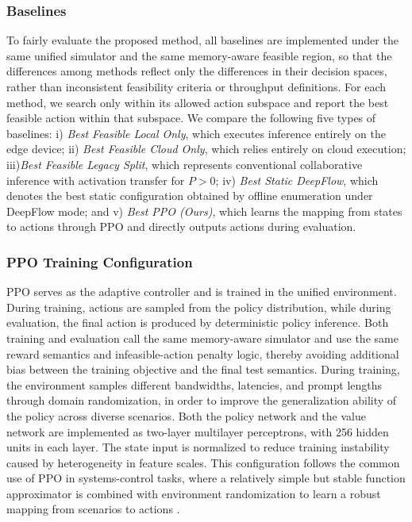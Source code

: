 \documentclass[a4paper,fleqn]{cas-dc}
\begin{document}
\subsubsection{Baselines}

To fairly evaluate the proposed method, all baselines are implemented under the same unified simulator and the same memory-aware feasible region, so that the differences among methods reflect only the differences in their decision spaces, rather than inconsistent feasibility criteria or throughput definitions. For each method, we search only within its allowed action subspace and report the best feasible action within that subspace. We compare the following five types of baselines: i) \emph{Best Feasible Local Only}, which executes inference entirely on the edge device; ii) \emph{Best Feasible Cloud Only}, which relies entirely on cloud execution; iii)\emph{Best Feasible Legacy Split}, which represents conventional collaborative inference with activation transfer for $P>0$; iv) \emph{Best Static DeepFlow}, which denotes the best static configuration obtained by offline enumeration under DeepFlow mode; and v) \emph{Best PPO (Ours)}, which learns the mapping from states to actions through PPO and directly outputs actions during evaluation.

\subsubsection{PPO Training Configuration}

PPO serves as the adaptive controller and is trained in the unified environment. During training, actions are sampled from the policy distribution, while during evaluation, the final action is produced by deterministic policy inference. Both training and evaluation call the same memory-aware simulator and use the same reward semantics and infeasible-action penalty logic, thereby avoiding additional bias between the training objective and the final test semantics. During training, the environment samples different bandwidths, latencies, and prompt lengths through domain randomization, in order to improve the generalization ability of the policy across diverse scenarios. Both the policy network and the value network are implemented as two-layer multilayer perceptrons, with 256 hidden units in each layer. The state input is normalized to reduce training instability caused by heterogeneity in feature scales. This configuration follows the common use of PPO in systems-control tasks, where a relatively simple but stable function approximator is combined with environment randomization to learn a robust mapping from scenarios to actions \cite{schulman2017ppo,qin2026twostageppo}.
\end{document}
